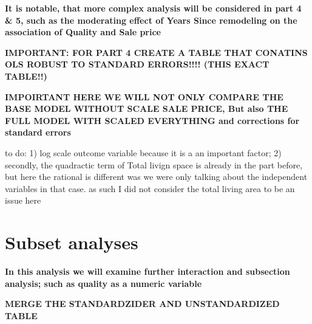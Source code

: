 \documentclass[a4paper]{article}
\begin{document}
\textbf{It is notable, that more complex analysis will be considered in part 4 \& 5, such as the moderating effect of Years Since remodeling on the association of Quality and Sale price}

\textbf{IMPORTANT: FOR PART 4 CREATE A TABLE THAT CONATINS OLS ROBUST TO STANDARD ERRORS!!!! (THIS EXACT TABLE!!)}

\textbf{IMPOIRTANT HERE WE WILL NOT ONLY COMPARE THE BASE MODEL WITHOUT SCALE SALE PRICE, But also THE FULL MODEL WITH SCALED EVERYTHING and corrections for standard errors }

to do: 1) log scale outcome variable because it is a an important factor; 2) secondly, the quadractic term of Total livign space is already in the part before, but here the rational is different was we were only talking about the independent variables in that case. as such I did not consider the total living area to be an issue here 




\section{Subset analyses}
\textbf{In this analysis we will examine further interaction and subsection analysis; such as quality as a numeric variable}














 
 

\textbf{MERGE THE STANDARDZIDER AND UNSTANDARDIZED TABLE}
\end{document}
